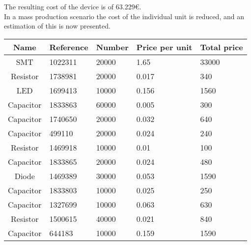 	The resulting cost of the device is of 63.229{\small \euro}.\\

	In a mass production scenario the cost of the individual unit is reduced, and an estimation of this is now presented.\\

\begin{tabular}{| c |l | l | l | l |} 
	\hline
		Name & Reference & Number & Price per unit & Total price\\ \hline
		SMT & 1022311 & 20000 & 1.65 & 33000\\ \hline
		Resistor & 1738981 & 20000 & 0.017 & 340\\ \hline
		LED & 1699413 & 10000 & 0.156 & 1560\\ \hline
		Capacitor & 1833863 & 60000 & 0.005 & 300\\ \hline
		Capacitor & 1740650 & 20000 & 0.032 & 640\\ \hline
		Capacitor & 499110 & 20000 & 0.024 & 240\\ \hline
		Resistor & 1469918 & 10000 & 0.01 & 100\\ \hline
		Capacitor & 1833865 & 20000 & 0.024  & 480\\ \hline
		Diode & 1469389 & 30000 & 0.053 & 1590\\ \hline
	   Capacitor & 1833803 & 10000 & 0.025 & 250\\ \hline
 		Capacitor & 1327699 & 10000 & 0.063 & 630 \\ \hline
  		Resistor & 1500615 & 40000 & 0.021 & 840\\ \hline
	 	Capacitor & 644183 & 10000 & 0.159 & 1590 \\ \hline
\end{tabular}\\\\
